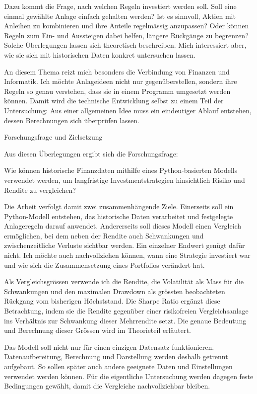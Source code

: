 \documentclass[
  ngerman,
  a4paper,
  DIV=11,
  oneside]{scrreprt}
\begin{document}
Dazu kommt die Frage, nach welchen Regeln investiert werden soll. Soll
eine einmal gewählte Anlage einfach gehalten werden? Ist es sinnvoll,
Aktien mit Anleihen zu kombinieren und ihre Anteile regelmässig
anzupassen? Oder können Regeln zum Ein- und Aussteigen dabei helfen,
längere Rückgänge zu begrenzen? Solche Überlegungen lassen sich
theoretisch beschreiben. Mich interessiert aber, wie sie sich mit
historischen Daten konkret untersuchen lassen.

An diesem Thema reizt mich besonders die Verbindung von Finanzen und
Informatik. Ich möchte Anlageideen nicht nur gegenüberstellen, sondern
ihre Regeln so genau verstehen, dass sie in einem Programm umgesetzt
werden können. Damit wird die technische Entwicklung selbst zu einem
Teil der Untersuchung: Aus einer allgemeinen Idee muss ein eindeutiger
Ablauf entstehen, dessen Berechnungen sich überprüfen lassen.

Forschungsfrage und Zielsetzung

Aus diesen Überlegungen ergibt sich die Forschungsfrage:

Wie können historische Finanzdaten mithilfe eines Python-basierten
Modells verwendet werden, um langfristige Investmentstrategien
hinsichtlich Risiko und Rendite zu vergleichen?

Die Arbeit verfolgt damit zwei zusammenhängende Ziele. Einerseits soll
ein Python-Modell entstehen, das historische Daten verarbeitet und
festgelegte Anlageregeln darauf anwendet. Andererseits soll dieses
Modell einen Vergleich ermöglichen, bei dem neben der Rendite auch
Schwankungen und zwischenzeitliche Verluste sichtbar werden. Ein
einzelner Endwert genügt dafür nicht. Ich möchte auch nachvollziehen
können, wann eine Strategie investiert war und wie sich die
Zusammensetzung eines Portfolios verändert hat.

Als Vergleichsgrössen verwende ich die Rendite, die Volatilität als Mass
für die Schwankungen und den maximalen Drawdown als grössten
beobachteten Rückgang vom bisherigen Höchststand. Die Sharpe Ratio
ergänzt diese Betrachtung, indem sie die Rendite gegenüber einer
risikofreien Vergleichsanlage ins Verhältnis zur Schwankung dieser
Mehrrendite setzt. Die genaue Bedeutung und Berechnung dieser Grössen
wird im Theorieteil erläutert.

Das Modell soll nicht nur für einen einzigen Datensatz funktionieren.
Datenaufbereitung, Berechnung und Darstellung werden deshalb getrennt
aufgebaut. So sollen später auch andere geeignete Daten und
Einstellungen verwendet werden können. Für die eigentliche Untersuchung
werden dagegen feste Bedingungen gewählt, damit die Vergleiche
nachvollziehbar bleiben.
\end{document}
